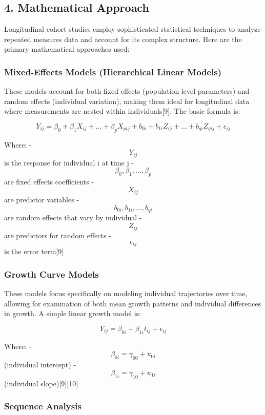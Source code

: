 \documentclass[
  letterpaper,
  DIV=11,
  numbers=noendperiod]{scrartcl}
\begin{document}
\subsection{4. Mathematical Approach}\label{mathematical-approach}

Longitudinal cohort studies employ sophisticated statistical techniques
to analyze repeated measures data and account for its complex structure.
Here are the primary mathematical approaches used:

\subsubsection{Mixed-Effects Models (Hierarchical Linear
Models)}\label{mixed-effects-models-hierarchical-linear-models}

These models account for both fixed effects (population-level
parameters) and random effects (individual variation), making them ideal
for longitudinal data where measurements are nested within
individuals{[}9{]}. The basic formula is:

\[ Y_{ij} = \beta_0 + \beta_1 X_{ij} + ... + \beta_p X_{pij} + b_{0i} + b_{1i}Z_{ij} + ... + b_{qi}Z_{qij} + \epsilon_{ij} \]

Where: - \[Y_{ij}\] is the response for individual i at time j -
\[\beta_0, \beta_1, ..., \beta_p\] are fixed effects coefficients -
\[X_{ij}\] are predictor variables - \[b_{0i}, b_{1i}, ..., b_{qi}\] are
random effects that vary by individual - \[Z_{ij}\] are predictors for
random effects - \[\epsilon_{ij}\] is the error term{[}9{]}

\subsubsection{Growth Curve Models}\label{growth-curve-models}

These models focus specifically on modeling individual trajectories over
time, allowing for examination of both mean growth patterns and
individual differences in growth. A simple linear growth model is:

\[ Y_{ij} = \beta_{0i} + \beta_{1i}t_{ij} + \epsilon_{ij} \]

Where: - \[\beta_{0i} = \gamma_{00} + u_{0i}\] (individual intercept) -
\[\beta_{1i} = \gamma_{10} + u_{1i}\] (individual slope){[}9{]}{[}10{]}

\subsubsection{Sequence Analysis}\label{sequence-analysis}
\end{document}
